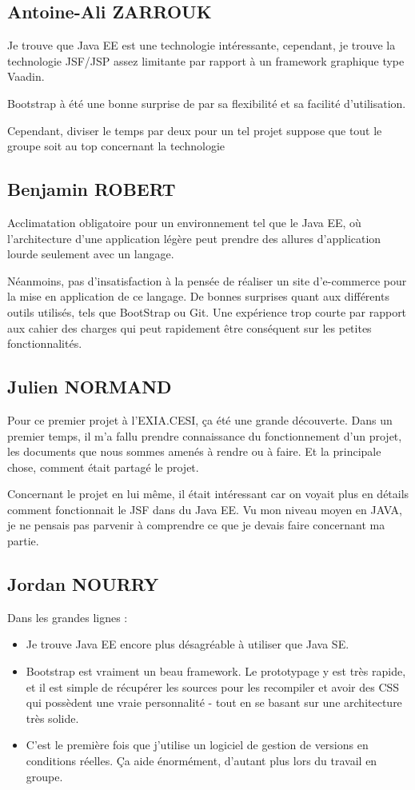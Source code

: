 \subsection{Antoine-Ali ZARROUK}
Je trouve que Java EE est une technologie intéressante, cependant, je trouve la technologie JSF/JSP assez limitante par rapport à un framework graphique type Vaadin.

Bootstrap à été une bonne surprise de par sa flexibilité et sa facilité d'utilisation.

Cependant, diviser le temps par deux pour un tel projet suppose que tout le groupe soit au top concernant la technologie

\subsection{Benjamin ROBERT}
Acclimatation obligatoire pour un environnement tel que le Java EE, où l'architecture d'une application légère peut prendre des allures d'application lourde seulement avec un langage.

Néanmoins, pas d'insatisfaction à la pensée de réaliser un site d'e-commerce pour la mise en application de ce langage. De bonnes surprises quant aux différents outils utilisés, tels que BootStrap ou Git. Une expérience trop courte par rapport aux cahier des charges qui peut rapidement être conséquent sur les petites fonctionnalités.

\subsection{Julien NORMAND}
Pour ce premier projet à l'EXIA.CESI, ça été une grande découverte. Dans un premier temps, il m'a fallu prendre connaissance du fonctionnement d'un projet, les documents que nous sommes amenés à rendre ou à faire. Et la principale chose, comment était partagé le projet.

Concernant le projet en lui même, il était intéressant car on voyait plus en détails comment fonctionnait le JSF dans du Java EE. Vu mon niveau moyen en JAVA, je ne pensais pas parvenir à comprendre ce que je devais faire concernant ma partie.

\subsection{Jordan NOURRY}
Dans les grandes lignes :
	\begin{itemize}
		\item Je trouve Java EE encore plus désagréable à utiliser que Java SE.
		\item Bootstrap est vraiment un beau framework. Le prototypage y est très rapide, et il est simple de récupérer les sources pour les recompiler et avoir des CSS qui possèdent une vraie personnalité - tout en se basant sur une architecture très solide.
		\item C'est le première fois que j'utilise un logiciel de gestion de versions en conditions réelles. Ça aide énormément, d'autant plus lors du travail en groupe.
	\end{itemize}

